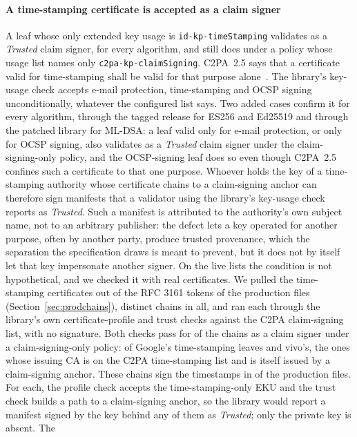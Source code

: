 \paragraph{A time-stamping certificate is accepted as a claim signer}
A leaf whose only extended key usage is \texttt{id-kp-timeStamping} validates
as a \emph{Trusted} claim signer, for every algorithm, and still does under a
policy whose usage list names only \texttt{c2pa-kp-claimSigning}. C2PA~2.5
says that a certificate valid for time-stamping shall be valid for that purpose
alone~\cite{c2pa25}. The library's key-usage check accepts e-mail protection,
time-stamping and OCSP signing unconditionally, whatever the configured list
says. Two added cases confirm it for every algorithm, through the tagged
release for ES256 and Ed25519 and through the patched library for ML-DSA: a
leaf valid only for e-mail protection, or only for OCSP signing, also
validates as a \emph{Trusted} claim signer under the claim-signing-only
policy, and the OCSP-signing leaf does so even though C2PA~2.5 confines such a
certificate to that one purpose. Whoever holds the key of a time-stamping
authority whose certificate chains to a claim-signing anchor can therefore
sign manifests that a validator using the library's key-usage check reports as
\emph{Trusted}. Such a manifest is attributed to the authority's own subject
name, not to an arbitrary publisher: the defect lets a key operated for
another purpose, often by another party, produce trusted provenance, which
the separation the specification draws is meant to prevent, but it does not by
itself let that key impersonate another signer. On the live lists the
condition is not hypothetical, and we checked it with real certificates. We
pulled the time-stamping certificates out of the RFC 3161 tokens of the
production files (Section~\ref{sec:prodchains}), \NtpcChains{} distinct chains
in all, and ran each through the library's own certificate-profile and trust
checks against the C2PA claim-signing list, with no signature. Both checks pass
for \NtpcStrong{} of the \NtpcChains{} chains as a claim signer under a
claim-signing-only policy: \NtpcGoogle{} of Google's time-stamping leaves and
vivo's, the ones whose issuing CA is on the C2PA time-stamping list and is
itself issued by a claim-signing anchor. These \NtpcStrong{} chains sign the
timestamps in \NtpcFiles{} of the production files. For each, the profile
check accepts the time-stamping-only EKU and the trust check builds a path to a
claim-signing anchor, so the library would report a manifest signed by the
key behind any of them as \emph{Trusted}; only the private key is absent. The

